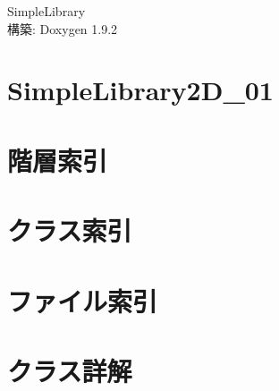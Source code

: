 \documentclass[twoside]{book}
\newcommand{\+}{\discretionary{\mbox{\scriptsize$\hookleftarrow$}}{}{}}
\newcommand{\clearemptydoublepage}{%
    \newpage{\pagestyle{empty}\cleardoublepage}%
  }
\begin{document}
  \raggedbottom
  \begin{CJK}{UTF8}{min}
    \hypersetup{pageanchor=false,
                bookmarksnumbered=true,
                pdfencoding=unicode
               }
  \begin{titlepage}
  \vspace*{7cm}
  \begin{center}%
  {\Large Simple\+Library}\\
  \vspace*{1cm}
  {\large 構築\+: Doxygen 1.9.2}\\
  \end{center}
  \end{titlepage}
  \clearemptydoublepage
  \tableofcontents
  \clearemptydoublepage
  \hypersetup{pageanchor=true}
\chapter{Simple\+Library2\+D\+\_\+01}
\label{md__r_e_a_d_m_e}

\chapter{階層索引}

\chapter{クラス索引}

\chapter{ファイル索引}

\chapter{クラス詳解}
























\end{CJK}
\end{document}
